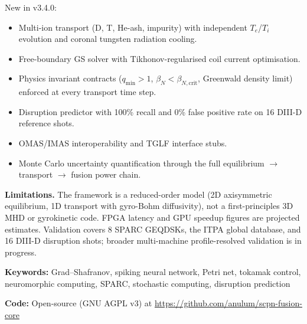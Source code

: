 \documentclass[12pt]{article}
\begin{document}
New in v3.4.0:
\begin{itemize}
  \item Multi-ion transport (D, T, He-ash, impurity) with independent
    $T_e$/$T_i$ evolution and coronal tungsten radiation cooling.
  \item Free-boundary GS solver with Tikhonov-regularised coil current
    optimisation.
  \item Physics invariant contracts ($q_{\min} > 1$,
    $\beta_N < \beta_{N,\mathrm{crit}}$, Greenwald density limit)
    enforced at every transport time step.
  \item Disruption predictor with 100\% recall and 0\% false positive
    rate on 16 DIII-D reference shots.
  \item OMAS/IMAS interoperability and TGLF interface stubs.
  \item Monte Carlo uncertainty quantification through the full
    equilibrium $\to$ transport $\to$ fusion power chain.
\end{itemize}

\noindent\textbf{Limitations.}
The framework is a reduced-order model (2D axisymmetric equilibrium,
1D transport with gyro-Bohm diffusivity), not a first-principles 3D
MHD or gyrokinetic code.  FPGA latency and GPU speedup figures are
projected estimates.  Validation covers 8 SPARC GEQDSKs, the ITPA
global database, and 16 DIII-D disruption shots; broader multi-machine
profile-resolved validation is in progress.

\medskip
\noindent\textbf{Keywords:}
Grad--Shafranov, spiking neural network, Petri net, tokamak control,
neuromorphic computing, SPARC, stochastic computing, disruption
prediction

\medskip
\noindent\textbf{Code:}
Open-source (GNU AGPL v3) at
\url{https://github.com/anulum/scpn-fusion-core}
\end{document}
